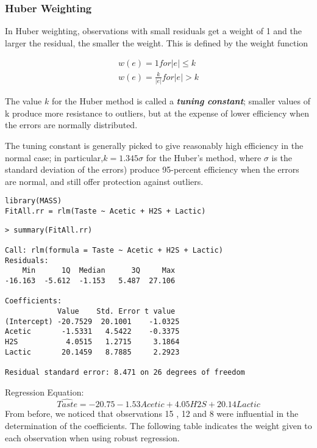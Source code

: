 \documentclass[main.tex]{subfiles}
\begin{document}
\subsubsection{Huber Weighting}
In Huber weighting, observations with small residuals get a weight of 1 and the larger the residual, the smaller the weight. This is defined by the weight function


\begin{eqnarray}
w(e) = 1 for |e| \leq k  \\
w(e) = \frac{k}{|e|} for |e| > k
\end{eqnarray}


The value $k$ for the Huber method is called a \textbf{\textit{tuning constant}}; smaller values of k produce more resistance to outliers, but at the expense of lower efficiency when the errors are normally distributed.

The tuning constant is generally picked to give reasonably high efficiency in the normal case; in particular,$ k = 1.345\sigma$ for the Huber’s method, where $\sigma$ is the standard deviation of the errors) produce 95-percent efficiency when the errors are normal, and still offer protection against outliers.


\begin{framed}
\begin{verbatim}
library(MASS)
FitAll.rr = rlm(Taste ~ Acetic + H2S + Lactic)
\end{verbatim}
\end{framed}

\begin{verbatim}
> summary(FitAll.rr)

Call: rlm(formula = Taste ~ Acetic + H2S + Lactic)
Residuals:
    Min      1Q  Median      3Q     Max 
-16.163  -5.612  -1.153   5.487  27.106 

Coefficients:
            Value    Std. Error t value 
(Intercept) -20.7529  20.1001    -1.0325
Acetic       -1.5331   4.5422    -0.3375
H2S           4.0515   1.2715     3.1864
Lactic       20.1459   8.7885     2.2923

Residual standard error: 8.471 on 26 degrees of freedom
\end{verbatim}

Regression Equation: 
\[ \hat{Taste} = -20.75 -1.53 Acetic + 4.05 H2S + 20.14 Lactic\]
From before, we noticed that observations 15 , 12 and 8 were influential in the determination of the coefficients. The following table indicates the weight given to each observation when using robust regression.  
\end{document}
